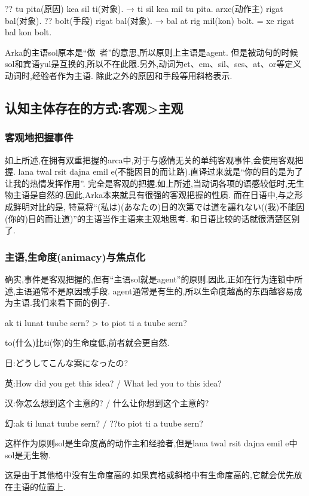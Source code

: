 ?? tu pita(原因) kea sil ti(对象). → ti sil kea mil tu pita.
arxe(动作主) rigat bal(对象).
?? bolt(手段) rigat bal(对象). → bal at rig mil(kon) bolt. = xe rigat bal kon bolt.

Arka的主语sol原本是“做~者”的意思,所以原则上主语是agent.
但是被动句的时候sol和宾语yul是互换的,所以不在此限.另外,动词为et、em、sil、ses、at、or等定义动词时,经验者作为主语.
除此之外的原因和手段等用斜格表示.

\subsection{认知主体存在的方式:客观>主观}

\subsubsection{客观地把握事件}

如上所述,在拥有双重把握的arca中,对于与感情无关的单纯客观事件,会使用客观把握.
lana twal rsit dajna emil e(不能因目的而让路).直译过来就是“你的目的是为了让我的热情发挥作用”.
完全是客观的把握.如上所述,当动词各项的语感较低时,无生物主语是自然的.因此,Arka本来就具有很强的客观把握的性质.
而在日语中,与之形成鲜明对比的是,
特意将“(私は)(あなたの)目的次第では道を譲れない((我)不能因(你的)目的而让道)”的主语当作主语来主观地思考.
和日语比较的话就很清楚区别了.

\subsubsection{主语,生命度(animacy)与焦点化}


确实,事件是客观把握的,但有``主语sol就是agent''的原则.因此,正如在行为连锁中所述,主语通常不是原因或手段.
agent通常是有生的,所以生命度越高的东西越容易成为主语.我们来看下面的例子.

ak ti lunat tuube sern? > to piot ti a tuube sern?

to(什么)比ti(你)的生命度低,前者就会更自然.

日:どうしてこんな案になったの?

英:How did you get this idea? / What led you to this idea?

汉:你怎么想到这个主意的? / 什么让你想到这个主意的?

幻:ak ti lunat tuube sern? / ??to piot ti a tuube sern?

这样作为原则sol是生命度高的动作主和经验者,但是lana twal rsit dajna emil e中sol是无生物.

这是由于其他格中没有生命度高的.如果宾格或斜格中有生命度高的,它就会优先放在主语的位置上.


